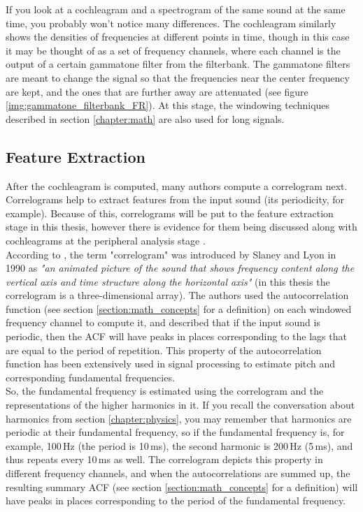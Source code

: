 If you look at a cochleagram and a spectrogram of the same sound at the same time, you probably won't notice many differences. The cochleagram similarly shows the densities of frequencies at different points in time, though in this case it may be thought of as a set of frequency channels, where each channel is the output of a certain gammatone filter from the filterbank. The gammatone filters are meant to change the signal so that the frequencies near the center frequency are kept, and the ones that are further away are attenuated (see figure \ref{img:gammatone_filterbank_FR}). At this stage, the windowing techniques described in section \ref{chapter:math} are also used for long signals.


\subsection{Feature Extraction}\label{subsection:casa_feature_extraction}

After the cochleagram is computed, many authors compute a correlogram next. Correlograms help to extract features from the input sound (its periodicity, for example). Because of this, correlograms will be put to the feature extraction stage in this thesis, however there is evidence for them being discussed along with cochleagrams at the peripheral analysis stage \cite{Jasti2020}.\\

According to \cite{Wang2006}, the term "correlogram" was introduced by Slaney and Lyon in 1990 \cite{Slaney1990} as \textit{"an animated picture of the sound that shows frequency content along the vertical axis and time structure along the horizontal axis"} (in this thesis the correlogram is a three-dimensional array). The authors used the autocorrelation function (see section \ref{section:math_concepts} for a definition) on each windowed frequency channel to compute it, and described that if the input sound is periodic, then the ACF will have peaks in places corresponding to the lags that are equal to the period of repetition. This property of the autocorrelation function has been extensively used in signal processing to estimate pitch and corresponding fundamental frequencies.\\

So, the fundamental frequency is estimated using the correlogram and the representations of the higher harmonics in it. If you recall the conversation about harmonics from section \ref{chapter:physics}, you may remember that harmonics are periodic at their fundamental frequency, so if the fundamental frequency is, for example, 100\,Hz (the period is 10\,ms), the second harmonic is 200\,Hz (5\,ms), and thus repeats every 10\,ms as well. The correlogram depicts this property in different frequency channels, and when the autocorrelations are summed up, the resulting summary ACF (see section \ref{section:math_concepts} for a definition) will have peaks in places corresponding to the period of the fundamental frequency.\\

